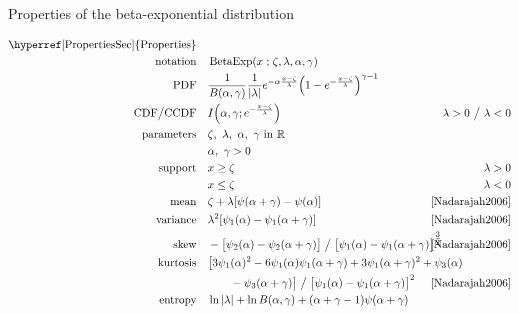 

\begin{table*}[tp!]
\caption[Beta-exponential distribution -- Properties]{Properties of the beta-exponential distribution}
\begin{align*}
\text{\hyperref[PropertiesSec]{Properties}}  \quad& \\
\text{notation} \quad & \op{BetaExp}(x\given \pLoc,\pScale,\alpha, \gamma)  \checked
\\
\text{PDF}\quad &   \frac{1}{B(\alpha, \gamma)} \frac{1}{|\pScale|} e^{-\alpha \frac{x-\pLoc}{\pScale} }  \Left(1 - e^{-\frac{x-\pLoc}{\pScale}  }\Right)^{\gamma-1}  \checked
\\
\text{CDF} \big/ \text{CCDF} \quad  & I\Left(\alpha,\gamma; e^{-\frac{x-\pLoc}{\pScale}} \Right)\checked & \hspace{-2em}\pScale>0 \ \big/ \ \pScale<0
\\
\text{parameters}\quad &   \pLoc,\ \pScale,\ \alpha,\  \gamma \text{ in } \Real	\checked \\
& \alpha,\ \gamma >0	\checked
\\
\text{support} \quad &     x \geq \pLoc \checked&  \pScale > 0
\\
&   x\leq \pLoc  \checked&  \pScale < 0 
\\
\text{mean} \quad  &  \pLoc+ \pScale [\psi(\alpha+\gamma) -\psi(\alpha)  ]  \checked & \text{\cite{Nadarajah2006}}
\\
\text{variance} \quad  & \pScale^2 [\psi_1(\alpha)-\psi_1(\alpha+\gamma) ]  \checked & \text{\cite{Nadarajah2006}}
\\
\text{skew} \quad  &-\bigl[{\psi_2(\alpha)-\psi_2(\alpha+\gamma)}\bigr] \bigm/ {  \bigl[\psi_1(\alpha)-\psi_1(\alpha+\gamma) \bigr]^{\tfrac{3}{2}} } \checked \hspace{-2em} &  \text{\cite{Nadarajah2006}}
\\
\text{kurtosis} \quad  &
\bigl[3\psi_1(\alpha)^2- 6\psi_1(\alpha)\psi_1(\alpha+\gamma)+ 3\psi_1(\alpha+\gamma)^2+\psi_3(\alpha)
\hspace{-4em} \\ &\qquad -\psi_3(\alpha+\gamma)\bigr] \bigm/ \bigl[ \psi_1(\alpha)-\psi_1(\alpha+\gamma) \bigr]^2
\checked	
 				&  \text{\cite{Nadarajah2006}}
\\
\text{entropy} \quad  & \ln |\pScale| +\ln B(\alpha,\gamma) + (\alpha+\gamma-1) \psi(\alpha+\gamma) 

\end{align*}
\end{table*}
